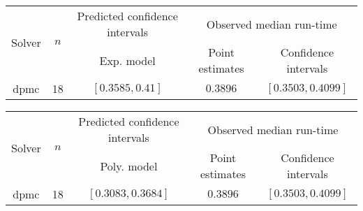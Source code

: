 \begin{tabular}{ccccc}
\hline 
\multirow{2}{*}{Solver} & \multirow{2}{*}{$n$} & Predicted confidence intervals & \multicolumn{2}{c}{Observed median  run-time}\tabularnewline
 &  & Exp. model  & Point estimates  & Confidence intervals\tabularnewline
\hline 
\hline 
\multirow{0}{*}{dpmc} & 18 & $\mathbf{\left[0.3585,0.41\right]}$ & $0.3896$ & $\left[0.3503,0.4099\right]$ \tabularnewline 
\hline 
\end{tabular} 

\begin{tabular}{ccccc}
\hline 
\multirow{2}{*}{Solver} & \multirow{2}{*}{$n$} & Predicted confidence intervals & \multicolumn{2}{c}{Observed median  run-time}\tabularnewline
 &  & Poly. model  & Point estimates  & Confidence intervals\tabularnewline
\hline 
\hline 
\multirow{0}{*}{dpmc} & 18 & $\mathbf{\left[0.3083,0.3684\right]}$ & $0.3896$ & $\left[0.3503,0.4099\right]$ \tabularnewline 
\hline 
\end{tabular} 


